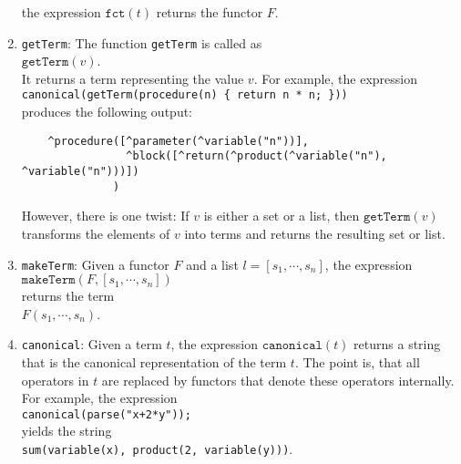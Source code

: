 \begin{enumerate}
      the expression $\mathtt{fct}(t)$ returns the functor $F$.
\item \texttt{getTerm}: The function \texttt{getTerm}  is called as
      \\[0.2cm]
      \hspace*{1.3cm}
      $\mathtt{getTerm}(v)$.
      \\[0.2cm]
      It returns a term representing the value $v$.  
      For example, the expression
      \\[0.2cm]
      \hspace*{1.3cm}
      \texttt{canonical(getTerm(procedure(n) \{ return n * n; \}))}
      \\[0.2cm]
      produces the following output:
\begin{verbatim}
    ^procedure([^parameter(^variable("n"))], 
                ^block([^return(^product(^variable("n"), ^variable("n")))])
              )
\end{verbatim}
      However, there is one twist: If $v$ is either a set or a list,
      then $\texttt{getTerm}(v)$ transforms the elements of $v$ into terms and returns the
      resulting set or list.  
\item \texttt{makeTerm}: Given a functor $F$ and a list $l = [s_1, \cdots, s_n]$,
      the expression
      \\[0.2cm]
      \hspace*{1.3cm}
      $\mathtt{makeTerm}(F, [s_1, \cdots, s_n])$
      \\[0.2cm]
      returns the term
      \\[0.2cm]
      \hspace*{1.3cm}
      $F(s_1, \cdots, s_n)$.
\item \texttt{canonical}:  Given a term $t$, the expression $\mathtt{canonical}(t)$
      returns a string that is the canonical representation of the term $t$.  The 
      point is, that all operators in $t$ are replaced by functors that denote
      these operators internally.  For example, the expression
      \\[0.2cm]
      \hspace*{1.3cm}
      \texttt{canonical(parse("x+2*y"));}
      \\[0.2cm]
      yields the string
      \\[0.2cm]
      \hspace*{1.3cm}
      \texttt{sum(variable(x), product(2, variable(y)))}.
      \\[0.2cm]

\end{enumerate}
